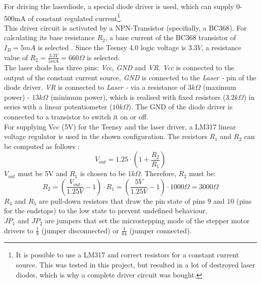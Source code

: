 \documentclass[a4paper, 11pt]{scrartcl}
\begin{document}
For driving the laserdiode, a special diode driver is used, which can supply 0-500mA of constant regulated current\footnote{It is possible to use a LM317 and correct resistors for a constant current source. This was tested in this project, but resulted in a lot of destroyed laser diodes, which is why a complete driver circuit was bought.}. \\
This driver circuit is activated by a NPN-Transistor (specifially, a BC368). For calculating its base resistance $R_2$, a base current of the BC368 transistor of $I_B=5mA$ is selected \cite[p. 3]{SemiconductorComponentsIndustries.2007}. Since the Teensy 4.0 logic voltage is $3.3V$, a resistance value of $R_2=\frac{3.3V}{5mA}=660\Omega$ is selected. \\
The laser diode has three pins: \textit{Vcc}, \textit{GND} and \textit{VR}. \textit{Vcc} is connected to the output of the constant current source, \textit{GND} is connected to the \textit{Laser -} pin of the diode driver. \textit{VR} is connected to \textit{Laser -} via a resistance of $3k\Omega$ (maximum power) - $13k\Omega$ (minimum power), which is realised with fixed resistors ($3.2k\Omega$) in series with a linear potentiometer ($10k\Omega$). The GND of the diode driver is connected to a transistor to switch it on or off.\\
For supplying Vcc (5V) for the Teensy and the laser driver, a LM317 linear voltage regulator is used in the shown configuration. The resistors $R_1$ and $R_2$ can be computed as follows \cite[p. 10]{lm317}: 
\begin{equation}
V_{out} = 1.25 \cdot \left( 1+\frac{R_2}{R_1} \right)
\end{equation}
$V_{out}$ must be 5V and $R_1$ is chosen to be $1k\Omega$. Therefore, $R_2$ must be:
\begin{equation}
R_2 = \left( \frac{V_{out}}{1.25V} - 1 \right) \cdot R_1 =  \left( \frac{5V}{1.25V} - 1 \right) \cdot 1000\Omega = 3000\Omega
\end{equation}
$R_4$ and $R_5$ are pull-down resistors that draw the pin state of pins $9$ and $10$ (pins for the endstops) to the low state to prevent undefined behaviour. \\
$JP_1$ and $JP_2$ are jumpers that set the microstepping mode of the stepper motor drivers to $\frac{1}{8}$ (jumper disconnected) or $\frac{1}{64}$ (jumper connected).
\end{document}
